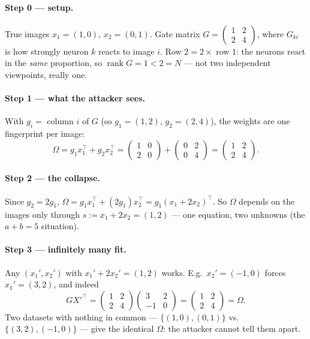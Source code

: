 \documentclass[11pt]{article}
\theoremstyle{definition}
\newcommand{\rank}{\operatorname{rank}}
\newcommand{\Om}{\Omega}
\begin{document}
\paragraph{Step 0 --- setup.} True images $x_1=(1,0)$, $x_2=(0,1)$. Gate matrix
$G=\left(\begin{smallmatrix}1&2\\2&4\end{smallmatrix}\right)$, where $G_{ki}$ is how strongly neuron
$k$ reacts to image $i$. Row $2=2\times$ row $1$: the neurons react in the \emph{same} proportion,
so $\rank G=1<2=N$ --- not two independent viewpoints, really one.

\paragraph{Step 1 --- what the attacker sees.} With $g_i=$ column $i$ of $G$ (so $g_1=(1,2)$,
$g_2=(2,4)$), the weights are one fingerprint per image:
\[
\Om=g_1 x_1^\top+g_2 x_2^\top
=\begin{pmatrix}1&0\\2&0\end{pmatrix}+\begin{pmatrix}0&2\\0&4\end{pmatrix}
=\begin{pmatrix}1&2\\2&4\end{pmatrix}.
\]

\paragraph{Step 2 --- the collapse.} Since $g_2=2g_1$,
$\Om=g_1x_1^\top+(2g_1)x_2^\top=g_1(x_1+2x_2)^\top$. So $\Om$ depends on the images only through
$s:=x_1+2x_2=(1,2)$ --- one equation, two unknowns (the $a+b=5$ situation).

\paragraph{Step 3 --- infinitely many fit.} Any $(x_1',x_2')$ with $x_1'+2x_2'=(1,2)$ works. E.g.\
$x_2'=(-1,0)$ forces $x_1'=(3,2)$, and indeed
\[
GX'^{\top}=\begin{pmatrix}1&2\\2&4\end{pmatrix}\begin{pmatrix}3&2\\-1&0\end{pmatrix}
=\begin{pmatrix}1&2\\2&4\end{pmatrix}=\Om .
\]
Two datasets with nothing in common --- $\{(1,0),(0,1)\}$ vs.\ $\{(3,2),(-1,0)\}$ --- give the
identical $\Om$: the attacker cannot tell them apart.
\end{document}
